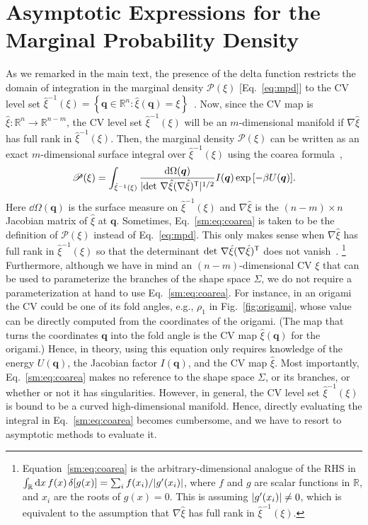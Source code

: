 \section{Asymptotic Expressions for the Marginal Probability Density}

  As we remarked in the main text, the presence of the delta function restricts the domain of integration in the marginal density $\mathscr{P}(\xi)$ [Eq.~\eqref{eq:mpd}] to the CV level set $\hat{\xi}^{-1}(\xi) = \left\{\bm{q} \in \mathbb{R}^{n}: \hat{\xi}(\bm{q}) = \xi\right\}$~\cite{hartmann2011}.
Now, since the CV map is $\hat{\xi}: \mathbb{R}^{n} \to \mathbb{R}^{n-m}$, the CV level set $\hat{\xi}^{-1}(\xi)$ will be an $m$-dimensional manifold if $\nabla\hat{\xi}$ has full rank in $\hat{\xi}^{-1}(\xi)$.
Then, the marginal density $\mathscr{P}(\xi)$ can be written as an exact $m$-dimensional surface integral over $\hat{\xi}^{-1}(\xi)$ using the coarea formula~\cite{hartmann2007,lelievre2010,hartmann2011,diaconis2013},
%
\begin{equation}
  \mathscr{P}(\xi) = \int_{\hat{\xi}^{-1}(\xi)} \frac{\mathrm{d}\Omega(\bm{q})}{\lvert\det\,\nabla\hat{\xi}(\nabla\hat{\xi})^\mathsf{T}\rvert^{1/2}} I(\bm{q}) \exp{\left[-\beta U(\bm{q})\right]}.
  \label{sm:eq:coarea}
\end{equation}
%
Here $\dd\Omega(\bm{q})$ is the surface measure on $\hat{\xi}^{-1}(\xi)$ and $\nabla\hat{\xi}$ is the $(n-m)\times n$ Jacobian matrix of $\hat{\xi}$ at $\bm{q}$.
Sometimes, Eq.~\eqref{sm:eq:coarea} is taken to be the definition of $\mathscr{P}(\xi)$ instead of Eq.~\eqref{eq:mpd}.
This only makes sense when $\nabla\hat{\xi}$ has full rank in $\hat{\xi}^{-1}(\xi)$ so that the determinant $\det\,\nabla\hat{\xi}(\nabla\hat{\xi})^\mathsf{T}$ does not vanish~\cite{lelievre2010}.%
\footnote{Equation~\eqref{sm:eq:coarea} is the arbitrary-dimensional analogue of the RHS in $\int_{\mathbb{R}} \mathrm{d}{x}\, f(x)\, \delta[g(x)] = \sum_{i} f(x_{i})/\lvert g'(x_{i})\rvert$, where $f$ and $g$ are scalar functions in $\mathbb{R}$, and $x_{i}$ are the roots of $g(x) = 0$. This is assuming $\lvert g'(x_{i})\rvert \neq 0$, which is equivalent to the assumption that $\nabla\hat{\xi}$ has full rank in $\hat{\xi}^{-1}(\xi)$.}
Furthermore, although we have in mind an $(n-m)$-dimensional CV $\xi$ that can be used to parameterize the branches of the shape space $\Sigma$, we do not require a parameterization at hand to use Eq.~\eqref{sm:eq:coarea}.
For instance, in an origami the CV could be one of its fold angles, e.g., $\rho_{1}$ in Fig.~\ref{fig:origami}, whose value can be directly computed from the coordinates of the origami.
(The map that turns the coordinates $\bm{q}$ into the fold angle is the CV map $\hat{\xi}(\bm{q})$ for the origami.)
Hence, in theory, using this equation only requires knowledge of the energy $U(\bm{q})$, the Jacobian factor $I(\bm{q})$, and the CV map $\hat{\xi}$.
Most importantly, Eq.~\eqref{sm:eq:coarea} makes no reference to the shape space $\Sigma$, or its branches, or whether or not it has singularities.
However, in general, the CV level set $\hat{\xi}^{-1}(\xi)$ is bound to be a curved high-dimensional manifold.
Hence, directly evaluating the integral in Eq.~\eqref{sm:eq:coarea} becomes cumbersome, and we have to resort to asymptotic methods to evaluate it.

